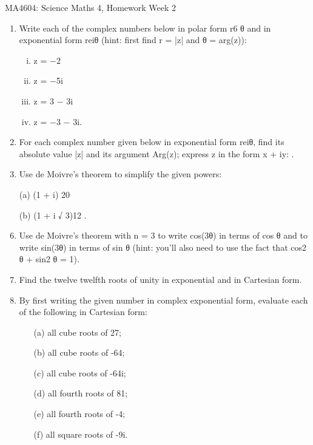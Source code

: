 \documentclass[12pt, a4paper]{report}
\theoremstyle{plain}
\theoremstyle{definition}
\theoremstyle{remark}
\begin{document}
\newpage
MA4604: Science Maths 4, Homework Week 2
\begin{enumerate}
\item Write each of the complex numbers below in polar form r6 θ and in exponential form reiθ
(hint: first find r = |z| and θ = arg(z)):
\begin{multicols}{2}
\begin{enumerate}[(i)]
	\item z = −2 \item z = −5i \item z = 3 − 3i \item z = −3 − 3i.
\end{enumerate}
\end{multicols}

\item For each complex number given below in exponential form reiθ, find its absolute value |z|
and its argument Arg(z); express z in the form x + iy:
.
\item Use de Moivre’s theorem to simplify the given powers: \item[(a)] (1 + i)
20 \item[(b)] (1 + i
√
3)12
.
\item Use de Moivre’s theorem with n = 3 to write cos(3θ) in terms of cos θ and to write sin(3θ)
in terms of sin θ (hint: you’ll also need to use the fact that cos2
θ + sin2
θ = 1).
\item Find the twelve twelfth roots of unity in exponential and in Cartesian form.
\item By first writing the given number in complex exponential form, evaluate each of the
following in Cartesian form:

\begin{multicols}{2}
\begin{enumerate}[(i)]
\item[(a)] all cube roots of 27; \item[(b)] all cube roots of -64;
\item[(c)] all cube roots of -64i; \item[(d)] all fourth roots of 81; \item[(e)] all fourth roots of -4;
\item[(f)] all square roots of -9i.
\end{enumerate}
\end{multicols}

\end{enumerate}
\end{document}
